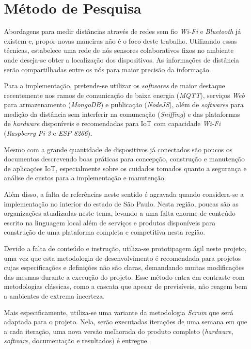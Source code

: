 
\chapter{Método de Pesquisa}
\label{chap:Método de Pesquisa}

Abordagens para medir distâncias através de redes sem fio \emph{Wi-Fi}
\cite{bahillo2009ieee} e \emph{Bluetooth} já existem e, propor novas maneiras
não é o foco deste trabalho. Utilizando essas técnicas, estabelece uma
rede de nós sensores colaborativos fixos no ambiente onde deseja-se obter a
localização dos dispositivos. As informações de distância serão compartilhadas
entre os nós para maior precisão da informação.

Para a implementação, pretende-se utilizar os \emph{softwares} de maior
destaque recentemente nos ramos de comunicação de baixa energia (\emph{MQTT}),
serviços \emph{Web} para armazenamento (\emph{MongoDB}) e publicação
(\emph{NodeJS}), além de \emph{softwares} para medição da distância sem
interferir na comuncação (\emph{Sniffing}) e das plataformas de
\emph{hardware} disponíveis e recomendadas para IoT com capacidade
\emph{Wi-Fi} (\emph{Raspberry Pi 3} e \emph{ESP-8266}).

Mesmo com a grande quantidade de dispositivos já conectados são poucos os
documentos descrevendo boas práticas para concepção, construção e manutenção de
aplicações IoT, especialmente sobre os cuidados tomados quanto a segurança e
análise de custos para a implementação e manutenção.

Além disso, a falta de referências neste sentido é agravada quando considera-se
a implementação no interior do estado de São Paulo. Nesta região, poucas são as
organizações atualizadas neste tema, levando a uma falta enorme de conteúdo
escrito na linguagem local além de serviços e produtos disponíveis para
construção de uma plataforma completa e competitiva nesta região.

Devido a falta de conteúdo e instrução, utiliza-se prototipagem ágil neste
projeto, uma vez que esta metodologia de desenvolvimento é recomendada para
projetos cujas especificações e definições não são claras, demandando muitas
modificações das mesmas durante a execução do projeto. Esse método entra em
contraste com metodologias clássicas, como a cascata que apesar de previsíveis,
não reagem bem a ambientes de extrema incerteza.

Mais especificamente, utiliza-se uma variante da metodologia \emph{Scrum}
\cite{James2016} que será adaptada para o projeto. Nela, serão executadas
iterações de uma semana em que a cada iteração, uma nova versão melhorada do
produto completo (\emph{hardware}, \emph{software}, documentação e
resultados) é entregue.

